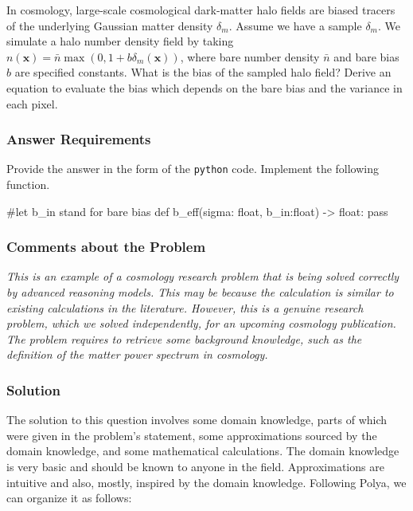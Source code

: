 In cosmology, large-scale cosmological dark-matter halo fields are biased tracers of the underlying Gaussian matter density $\delta_m$. Assume we have a sample $\delta_m$. We simulate a halo number density field by taking $n(\mathbf{x}) = \bar{n}\max(0,1+b\delta_m(\mathbf{x}))$, where bare number density $\bar{n}$ and bare bias $b$ are specified constants. What is the bias of the sampled halo field? Derive an equation to evaluate the bias which depends on the bare bias and the variance in each pixel.


\subsubsection*{Answer Requirements}
Provide the answer in the form of the \texttt{python} code. Implement the following function.
\begin{python}
#let b_in stand for bare bias
def b_eff(sigma: float, b_in:float) -> float:
    pass
\end{python}


\subsubsection*{Comments about the Problem}

\textit{This is an example of a cosmology research problem that is being solved correctly by advanced reasoning models. This may be because the calculation is similar to existing calculations in the literature. However, this is a genuine research problem, which we solved independently, for an upcoming cosmology publication. The problem requires to retrieve some background knowledge, such as the definition of the matter power spectrum in cosmology.} 


\subsubsection*{Solution}

The solution to this question involves some domain knowledge, parts of which were given in the problem's statement, some approximations sourced by the domain knowledge, and some mathematical calculations. The domain knowledge is very basic and should be known to anyone in the field. Approximations are intuitive and also, mostly, inspired by the domain knowledge. Following Polya, we can organize it as follows: \\

